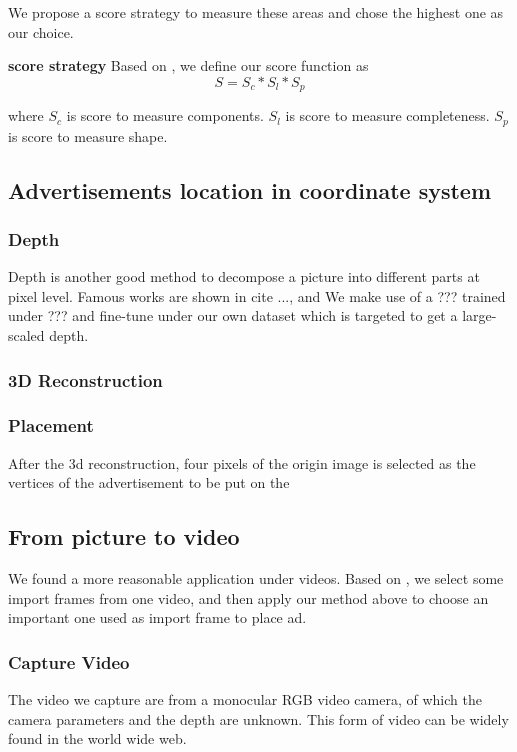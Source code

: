 \documentclass{sig-alternate}
\begin{document}
We propose a score strategy to measure these areas and chose the highest one as our choice.

\textbf{score strategy} Based on \cite{xxx}, we define our score function as 
$$S = S_c * S_l * S_p $$

where 
$S_c$ is score to measure components.
$S_l$ is score to measure completeness.
$S_p$ is score to measure shape.




\subsection{Advertisements location in coordinate system}

\subsubsection{Depth}
Depth is another good method to decompose a picture into different parts at pixel level. Famous works are shown in cite ..., and We make use of a ??? trained under ??? and fine-tune under our own dataset which is targeted to get a large-scaled depth. 

\subsubsection{3D Reconstruction}



\subsubsection{Placement}
After the 3d reconstruction, four pixels of the origin image is selected as the vertices of the advertisement to be put on the 

\subsection{From picture to video}

We found a more reasonable application under videos. Based on \cite{}, we select some import frames from one video, and then apply our method above to choose an important one used as import frame to place ad.

\subsubsection{Capture Video}
The video we capture are from a monocular RGB video camera, of which the camera parameters and the depth are unknown. This form of video can be widely found in the world wide web. 
\end{document}

